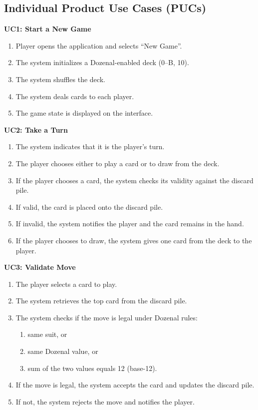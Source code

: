 \documentclass[12pt]{article}
\begin{document}
\subsection{Individual Product Use Cases (PUCs)}

\noindent\textbf{UC1: Start a New Game}
\begin{enumerate}
    \item Player opens the application and selects ``New Game''.
    \item The system initializes a Dozenal-enabled deck (0--B, 10).
    \item The system shuffles the deck.
    \item The system deals cards to each player.
    \item The game state is displayed on the interface.
\end{enumerate}

\noindent\textbf{UC2: Take a Turn}
\begin{enumerate}
    \item The system indicates that it is the player’s turn.
    \item The player chooses either to play a card or to draw from the deck.
    \item If the player chooses a card, the system checks its validity against the discard pile.
    \item If valid, the card is placed onto the discard pile.
    \item If invalid, the system notifies the player and the card remains in the hand.
    \item If the player chooses to draw, the system gives one card from the deck to the player.
\end{enumerate}

\noindent\textbf{UC3: Validate Move}
\begin{enumerate}
    \item The player selects a card to play.
    \item The system retrieves the top card from the discard pile.
    \item The system checks if the move is legal under Dozenal rules:
    \begin{enumerate}
        \item same suit, or
        \item same Dozenal value, or
        \item sum of the two values equals 12 (base-12).
    \end{enumerate}
    \item If the move is legal, the system accepts the card and updates the discard pile.
    \item If not, the system rejects the move and notifies the player.
\end{enumerate}
\end{document}

